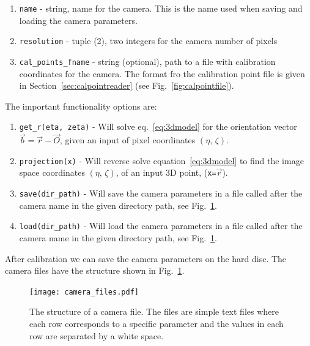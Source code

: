 \documentclass[10pt,a4paper]{article}
\begin{document}
\begin{enumerate}
	\item \texttt{name} - string, name for the camera. This is the name used when saving and loading the camera parameters.
	\item \texttt{resolution} - tuple (2), two integers for the camera number of pixels
	\item \texttt{cal\_points\_fname} - string (optional), path to a file with calibration coordinates for the camera. The format fro the calibration point file is given in Section~\ref{sec:calpointreader} (see Fig.~\ref{fig:calpointfile}).
\end{enumerate}


The important functionality options are:


\begin{enumerate}
	\item \texttt{get\_r(eta, zeta)} - Will solve eq.~\ref{eq:3dmodel} for the orientation vector $\vec{b} = \vec{r} - \vec{O}$, given an input of pixel coordinates $(\eta, \, \zeta)$.
	
	\item \texttt{projection(x)} - Will reverse solve equation~\eqref{eq:3dmodel} to find the image space coordinates $(\eta, \, \zeta)$, of an input 3D point, (\texttt{x=}$\vec{r}$).
	
	\item \texttt{save(dir\_path)} - Will save the camera parameters in a file called after the camera name in the given directory path, see Fig.~\ref{fig:camfiles}.
	
	\item \texttt{load(dir\_path)} - Will load the camera parameters in a file called after the camera name in the given directory path, see Fig.~\ref{fig:camfiles}.
\end{enumerate}



After calibration we can save the camera parameters on the hard disc. The camera files have the structure shown in Fig.~\ref{fig:camfiles}.

\begin{figure}[!ht]
	\centering
	\texttt{[image: camera\_files.pdf]}
	\caption{The structure of a camera file. The files are simple text files where each row corresponds to a specific parameter and the values in each row are separated by a white space. \label{fig:camfiles}}
\end{figure}
\end{document}
